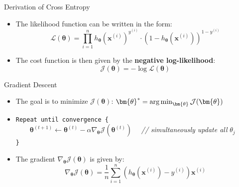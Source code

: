 \begin{frame}{Derivation of Cross Entropy}{}\optional
	\begin{itemize}
		\item The likelihood function can be written in the form:
		\begin{equation}
			\mathcal{L}(\bm{\theta}) = \prod_{i=1}^n h_{\bm{\theta}}(\bm{x}^{(i)})^{y^{(i)}} \cdot (1 - h_{\bm{\theta}}(\bm{x}^{(i)}))^{1 - y^{(i)}}
		\end{equation}
		\item The cost function is then given by the \textbf{negative log-likelihood}:
		\begin{equation}
			\mathcal{J}(\bm{\theta}) = -\log \mathcal{L}(\bm{\theta})
		\end{equation}
	\end{itemize}
\end{frame}


\begin{frame}{Gradient Descent}{}
	\begin{itemize}
		\item The goal is to minimize $\mathcal{J}(\bm{\theta})$: $\bm{\theta}^*
			= \argmin_{\bm{\theta}} \mathcal{J}(\bm{\theta})$
		\item \texttt{Repeat until convergence \{} \\
			$\qquad \bm{\theta}^{(t+1)} \longleftarrow \bm{\theta}^{(t)} - \alpha \nabla_{\bm{\theta}}
				\mathcal{J}(\bm{\theta}^{(t)}) \quad$
			\textcolor{myblue1}{\textit{// simultaneously update all} $\theta_j$} \\
		\texttt{\}}
		\item The gradient $\nabla_{\bm{\theta}} \mathcal{J}(\bm{\theta})$ is given by:
		{\footnotesize
		\begin{equation}
			\nabla_{\bm{\theta}} \mathcal{J}(\bm{\theta}) = \frac{1}{n} \sum_{i=1}^n \left(
				h_{\bm{\theta}}(\bm{x}^{(i)}) - y^{(i)}
			\right) \bm{x}^{(i)}
		\end{equation}}
	\end{itemize}
	\vspace*{-3mm}
	\begin{boxBlueNoFrame}
	\end{boxBlueNoFrame}
\end{frame}


